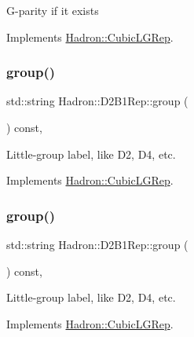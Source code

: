 G-\/parity if it exists 

Implements \mbox{\hyperlink{structHadron_1_1CubicLGRep_ace26f7b2d55e3a668a14cb9026da5231}{Hadron\+::\+Cubic\+L\+G\+Rep}}.

\mbox{\label{structHadron_1_1D2B1Rep_aa089e3f39579397519c844b305a926b9}} 
\subsubsection{\texorpdfstring{group()}{group()}\hspace{0.1cm}{\footnotesize\ttfamily [1/5]}}
{\footnotesize\ttfamily std\+::string Hadron\+::\+D2\+B1\+Rep\+::group (\begin{DoxyParamCaption}{ }\end{DoxyParamCaption}) const\hspace{0.3cm}{\ttfamily [inline]}, {\ttfamily [virtual]}}

Little-\/group label, like D2, D4, etc. 

Implements \mbox{\hyperlink{structHadron_1_1CubicLGRep_a9bdb14b519a611d21379ed96a3a9eb41}{Hadron\+::\+Cubic\+L\+G\+Rep}}.

\mbox{\label{structHadron_1_1D2B1Rep_aa089e3f39579397519c844b305a926b9}} 
\subsubsection{\texorpdfstring{group()}{group()}\hspace{0.1cm}{\footnotesize\ttfamily [2/5]}}
{\footnotesize\ttfamily std\+::string Hadron\+::\+D2\+B1\+Rep\+::group (\begin{DoxyParamCaption}{ }\end{DoxyParamCaption}) const\hspace{0.3cm}{\ttfamily [inline]}, {\ttfamily [virtual]}}

Little-\/group label, like D2, D4, etc. 

Implements \mbox{\hyperlink{structHadron_1_1CubicLGRep_a9bdb14b519a611d21379ed96a3a9eb41}{Hadron\+::\+Cubic\+L\+G\+Rep}}.

\mbox{\label{structHadron_1_1D2B1Rep_aa089e3f39579397519c844b305a926b9}} 
